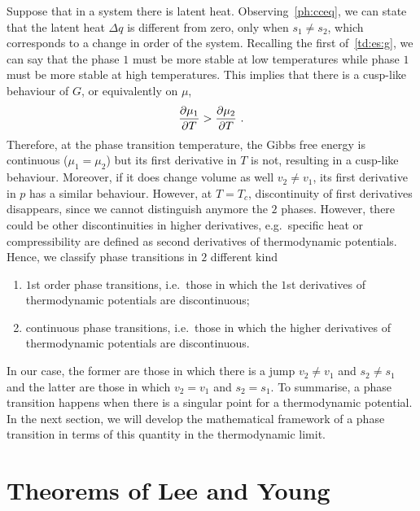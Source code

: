 
    Suppose that in a system there is latent heat. Observing~\eqref{ph:cceq}, we can state that the latent heat $\Delta q$ is different from zero, only when $s_1 \neq s_2$, which corresponds to a change in order of the system. Recalling the first of~\eqref{td:es:g}, we can say that the phase $1$ must be more stable at low temperatures while phase $1$ must be more stable at high temperatures. This implies that there is a cusp-like behaviour of $G$, or equivalently on $\mu$,
    \begin{equation*}
        \frac{\partial\mu_1}{\partial T} > \frac{\partial\mu_2}{\partial T} ~.
    \end{equation*}
    Therefore, at the phase transition temperature, the Gibbs free energy is continuous ($\mu_1 = \mu_2$) but its first derivative in $T$ is not, resulting in a cusp-like behaviour. Moreover, if it does change volume as well $v_2 \neq v_1$, its first derivative in $p$ has a similar behaviour. However, at $T = T_c$, discontinuity of first derivatives disappears, since we cannot distinguish anymore the $2$ phases. However, there could be other discontinuities in higher derivatives, e.g.~specific heat or compressibility are defined as second derivatives of thermodynamic potentials. Hence, we classify phase transitions in $2$ different kind 
    \begin{enumerate}
        \item $1$st order phase transitions, i.e.~those in which the $1$st derivatives of thermodynamic potentials are discontinuous;
        \item continuous phase transitions, i.e.~those in which the higher derivatives of thermodynamic potentials are discontinuous.
    \end{enumerate}
    In our case, the former are those in which there is a jump $v_2 \neq v_1$ and $s_2 \neq s_1$ and the latter are those in which $v_2 = v_1$ and $s_2 = s_1$. To summarise, a phase transition happens when there is a singular point for a thermodynamic potential.  
    In the next section, we will develop the mathematical framework of a phase transition in terms of this quantity in the thermodynamic limit.

\section{Theorems of Lee and Young}

